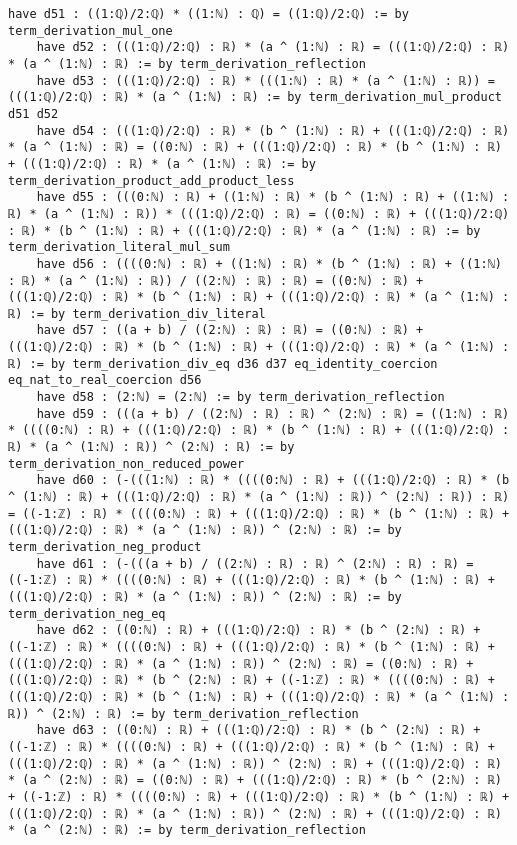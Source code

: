 \documentclass{article}
\begin{document}
\begin{tcolorbox}[colback=white!10, width=\linewidth]
\begin{lstlisting}[language=Lean4]
    have d51 : ((1:ℚ)/2:ℚ) * ((1:ℕ) : ℚ) = ((1:ℚ)/2:ℚ) := by term_derivation_mul_one
    have d52 : (((1:ℚ)/2:ℚ) : ℝ) * (a ^ (1:ℕ) : ℝ) = (((1:ℚ)/2:ℚ) : ℝ) * (a ^ (1:ℕ) : ℝ) := by term_derivation_reflection
    have d53 : (((1:ℚ)/2:ℚ) : ℝ) * (((1:ℕ) : ℝ) * (a ^ (1:ℕ) : ℝ)) = (((1:ℚ)/2:ℚ) : ℝ) * (a ^ (1:ℕ) : ℝ) := by term_derivation_mul_product d51 d52
    have d54 : (((1:ℚ)/2:ℚ) : ℝ) * (b ^ (1:ℕ) : ℝ) + (((1:ℚ)/2:ℚ) : ℝ) * (a ^ (1:ℕ) : ℝ) = ((0:ℕ) : ℝ) + (((1:ℚ)/2:ℚ) : ℝ) * (b ^ (1:ℕ) : ℝ) + (((1:ℚ)/2:ℚ) : ℝ) * (a ^ (1:ℕ) : ℝ) := by term_derivation_product_add_product_less
    have d55 : (((0:ℕ) : ℝ) + ((1:ℕ) : ℝ) * (b ^ (1:ℕ) : ℝ) + ((1:ℕ) : ℝ) * (a ^ (1:ℕ) : ℝ)) * (((1:ℚ)/2:ℚ) : ℝ) = ((0:ℕ) : ℝ) + (((1:ℚ)/2:ℚ) : ℝ) * (b ^ (1:ℕ) : ℝ) + (((1:ℚ)/2:ℚ) : ℝ) * (a ^ (1:ℕ) : ℝ) := by term_derivation_literal_mul_sum
    have d56 : ((((0:ℕ) : ℝ) + ((1:ℕ) : ℝ) * (b ^ (1:ℕ) : ℝ) + ((1:ℕ) : ℝ) * (a ^ (1:ℕ) : ℝ)) / ((2:ℕ) : ℝ) : ℝ) = ((0:ℕ) : ℝ) + (((1:ℚ)/2:ℚ) : ℝ) * (b ^ (1:ℕ) : ℝ) + (((1:ℚ)/2:ℚ) : ℝ) * (a ^ (1:ℕ) : ℝ) := by term_derivation_div_literal
    have d57 : ((a + b) / ((2:ℕ) : ℝ) : ℝ) = ((0:ℕ) : ℝ) + (((1:ℚ)/2:ℚ) : ℝ) * (b ^ (1:ℕ) : ℝ) + (((1:ℚ)/2:ℚ) : ℝ) * (a ^ (1:ℕ) : ℝ) := by term_derivation_div_eq d36 d37 eq_identity_coercion eq_nat_to_real_coercion d56
    have d58 : (2:ℕ) = (2:ℕ) := by term_derivation_reflection
    have d59 : (((a + b) / ((2:ℕ) : ℝ) : ℝ) ^ (2:ℕ) : ℝ) = ((1:ℕ) : ℝ) * ((((0:ℕ) : ℝ) + (((1:ℚ)/2:ℚ) : ℝ) * (b ^ (1:ℕ) : ℝ) + (((1:ℚ)/2:ℚ) : ℝ) * (a ^ (1:ℕ) : ℝ)) ^ (2:ℕ) : ℝ) := by term_derivation_non_reduced_power
    have d60 : (-(((1:ℕ) : ℝ) * ((((0:ℕ) : ℝ) + (((1:ℚ)/2:ℚ) : ℝ) * (b ^ (1:ℕ) : ℝ) + (((1:ℚ)/2:ℚ) : ℝ) * (a ^ (1:ℕ) : ℝ)) ^ (2:ℕ) : ℝ)) : ℝ) = ((-1:ℤ) : ℝ) * ((((0:ℕ) : ℝ) + (((1:ℚ)/2:ℚ) : ℝ) * (b ^ (1:ℕ) : ℝ) + (((1:ℚ)/2:ℚ) : ℝ) * (a ^ (1:ℕ) : ℝ)) ^ (2:ℕ) : ℝ) := by term_derivation_neg_product
    have d61 : (-(((a + b) / ((2:ℕ) : ℝ) : ℝ) ^ (2:ℕ) : ℝ) : ℝ) = ((-1:ℤ) : ℝ) * ((((0:ℕ) : ℝ) + (((1:ℚ)/2:ℚ) : ℝ) * (b ^ (1:ℕ) : ℝ) + (((1:ℚ)/2:ℚ) : ℝ) * (a ^ (1:ℕ) : ℝ)) ^ (2:ℕ) : ℝ) := by term_derivation_neg_eq
    have d62 : ((0:ℕ) : ℝ) + (((1:ℚ)/2:ℚ) : ℝ) * (b ^ (2:ℕ) : ℝ) + ((-1:ℤ) : ℝ) * ((((0:ℕ) : ℝ) + (((1:ℚ)/2:ℚ) : ℝ) * (b ^ (1:ℕ) : ℝ) + (((1:ℚ)/2:ℚ) : ℝ) * (a ^ (1:ℕ) : ℝ)) ^ (2:ℕ) : ℝ) = ((0:ℕ) : ℝ) + (((1:ℚ)/2:ℚ) : ℝ) * (b ^ (2:ℕ) : ℝ) + ((-1:ℤ) : ℝ) * ((((0:ℕ) : ℝ) + (((1:ℚ)/2:ℚ) : ℝ) * (b ^ (1:ℕ) : ℝ) + (((1:ℚ)/2:ℚ) : ℝ) * (a ^ (1:ℕ) : ℝ)) ^ (2:ℕ) : ℝ) := by term_derivation_reflection
    have d63 : ((0:ℕ) : ℝ) + (((1:ℚ)/2:ℚ) : ℝ) * (b ^ (2:ℕ) : ℝ) + ((-1:ℤ) : ℝ) * ((((0:ℕ) : ℝ) + (((1:ℚ)/2:ℚ) : ℝ) * (b ^ (1:ℕ) : ℝ) + (((1:ℚ)/2:ℚ) : ℝ) * (a ^ (1:ℕ) : ℝ)) ^ (2:ℕ) : ℝ) + (((1:ℚ)/2:ℚ) : ℝ) * (a ^ (2:ℕ) : ℝ) = ((0:ℕ) : ℝ) + (((1:ℚ)/2:ℚ) : ℝ) * (b ^ (2:ℕ) : ℝ) + ((-1:ℤ) : ℝ) * ((((0:ℕ) : ℝ) + (((1:ℚ)/2:ℚ) : ℝ) * (b ^ (1:ℕ) : ℝ) + (((1:ℚ)/2:ℚ) : ℝ) * (a ^ (1:ℕ) : ℝ)) ^ (2:ℕ) : ℝ) + (((1:ℚ)/2:ℚ) : ℝ) * (a ^ (2:ℕ) : ℝ) := by term_derivation_reflection

\end{lstlisting}
\end{tcolorbox}
\end{document}
